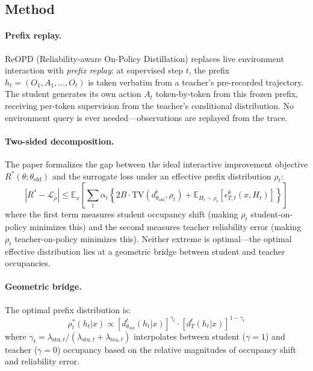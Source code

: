 \documentclass[11pt,a4paper]{article}
\begin{document}
\subsection{Method}

\paragraph{Prefix replay.}
ReOPD (Reliability-aware On-Policy Distillation) replaces live environment interaction with \emph{prefix replay}: at supervised step $t$, the prefix $h_t = (O_1, A_1, \ldots, O_t)$ is taken verbatim from a teacher's pre-recorded trajectory. The student generates its own action $A_t$ token-by-token from this frozen prefix, receiving per-token supervision from the teacher's conditional distribution. No environment query is ever needed---observations are replayed from the trace.

\paragraph{Two-sided decomposition.}
The paper formalizes the gap between the ideal interactive improvement objective $R^*(\theta; \theta_{\text{old}})$ and the surrogate loss under an effective prefix distribution $\rho_t$:
\begin{equation}
    |R^* - \mathcal{L}_\rho| \leq \mathbb{E}_x\left[\sum_t \alpha_t \left\{ 2B \cdot \text{TV}(d_{\theta_{\text{old}}}^t, \rho_t) + \mathbb{E}_{H_t \sim \rho_t}[\epsilon_{T,t}^\theta(x, H_t)] \right\}\right]
\end{equation}
where the first term measures student occupancy shift (making $\rho_t$ student-on-policy minimizes this) and the second measures teacher reliability error (making $\rho_t$ teacher-on-policy minimizes this). Neither extreme is optimal---the optimal effective distribution lies at a geometric bridge between student and teacher occupancies.

\paragraph{Geometric bridge.}
The optimal prefix distribution is:
\begin{equation}
    \rho_t^*(h_t|x) \propto [d_{\theta_{\text{old}}}^t(h_t|x)]^{\gamma_t} \cdot [d_T^t(h_t|x)]^{1-\gamma_t}
\end{equation}
where $\gamma_t = \lambda_{\text{stu},t}/(\lambda_{\text{stu},t} + \lambda_{\text{tea},t})$ interpolates between student ($\gamma=1$) and teacher ($\gamma=0$) occupancy based on the relative magnitudes of occupancy shift and reliability error.
\end{document}
